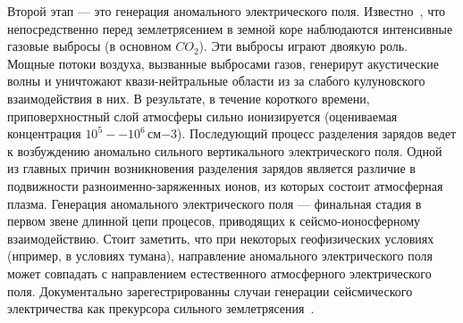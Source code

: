 \documentclass[12pt, oneside, a4paper]{article}
\begin{document}
Второй этап --- это генерация аномального электрического поля. Известно~\cite{Voitov_Dobrovolsky:1994}, что непосредственно перед землетрясением в земной коре наблюдаются интенсивные газовые выбросы (в основном $CO_2$). Эти выбросы играют двоякую роль. Мощные потоки воздуха, вызванные выбросами газов, генерирут акустические волны и уничтожают квази-нейтральные области из за слабого кулуновского взаимодействия в них. В результате, в течение короткого времени, приповерхностный слой атмосферы сильно ионизируется (оцениваемая концентрация $10^5--10^6$\,см$-3$). Последующий процесс разделения зарядов ведет к возбуждению аномально сильного вертикального электрического поля. Одной из главных причин возникновения разделения зарядов является различие в подвижности разноименно-заряженных ионов, из которых состоит атмосферная плазма. Генерация аномального электрического поля --- финальная стадия в первом звене длинной цепи процесов, приводящих к сейсмо-ионосферному взаимодействию. Стоит заметить, что при некоторых геофизических условиях (нпример, в условиях тумана), направление аномального электрического поля может совпадать с направлением естественного атмосферного электрического поля. Документально зарегестрированны случаи генерации сейсмического электричества как прекурсора сильного землетрясения~\cite{Jianguo:1989,Vershinin:1999}.
\end{document}
